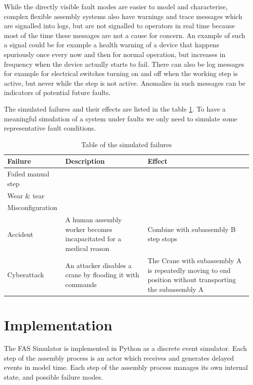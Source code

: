 \documentclass[journal]{IEEEtran}
\begin{document}
While the directly visible fault modes are easier to model and characterise, complex flexible assembly systems also have warnings and trace messages
which are signalled into logs, but are not signalled to operators in real time because most of the time these messages are not a cause for concern.
An example of such a signal could be for example a health warning of a device that happens spuriously once every now and then for normal operation,
but increases in frequency when the device actually starts to fail. There can also be log messages for example for electrical switches turning
on and off when the working step is active, but never while the step is not active. Anomalies in such messages can be indicators of potential
future faults.

The simulated failures and their effects are listed in the table \ref{failures}.
To have a meaningful simulation of a system under faults we only need to simulate some representative fault conditions.

\begin{table}[!t]
\renewcommand{\arraystretch}{1.3}
\caption{Table of the simulated failures}
\label{failures}
\centering
\begin{tabular}{|p{20mm}|p{20mm}|p{20mm}|}
\hline
Failure & Description & Effect \\
\hline
\hline
Failed manual step & & \\
\hline
Wear \& tear & & \\
\hline
Misconfiguration & & \\
\hline
Accident & A human assembly worker becomes incapacitated for a medical reason & Combine with subassembly B step stops \\
\hline
Cyberattack & An attacker disables a crane by flooding it with commands  & The Crane with subassembly A is repeatedly moving to end position without transporting the subassembly A \\
\hline
\end{tabular}
\end{table}

\section{Implementation}

The FAS Simulator\cite{FASSimulator} is implemented in Python as a discrete event simulator. Each step of the assembly process is an actor which receives and generates
delayed events in model time. Each step of the assembly process manages its own internal state, and possible failure modes.
\end{document}
